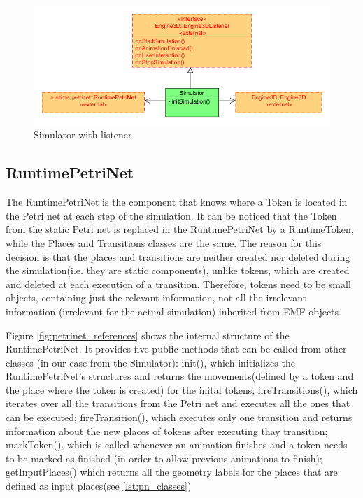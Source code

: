 \begin{figure}[ht]
   \begin{center}
       \includegraphics[scale=0.50]{image/simulator_design.png}
       \caption{Simulator with listener}
       \label{fig:simulator_design}
       \end{center}
   \end{figure}

\subsection{RuntimePetriNet}
The RuntimePetriNet is the component that knows where a Token is located in
the Petri net at each step of the simulation. It can be noticed that the Token
from the static Petri net is replaced in the RuntimePetriNet by a RuntimeToken,
while the Places and Transitions classes are the same. The reason for this decision
is that the places and transitions are neither created nor deleted during the
simulation(i.e. they are static components), unlike tokens, which are created
and deleted at each execution of a transition. Therefore, tokens need to be
small objects, containing just the relevant information, not all the irrelevant
information (irrelevant for the actual simulation) inherited from EMF objects.

Figure \ref{fig:petrinet_references} shows the internal structure of the RuntimePetriNet. It provides
five public methods that can be called from other classes (in our case from the
Simulator): init(), which initializes the RuntimePetriNet's structures and returns the 
movements(defined by a token and the place where the token is created) for the inital tokens; fireTransitions(), 
which iterates over all the transitions from the Petri net and executes all the ones that can be executed; fireTransition(), which
executes only one transition and returns information about the new places of tokens after executing thay transition;
markToken(), which is called whenever an animation finishes and a token needs to
be marked as finished (in order to allow previous animations to finish); getInputPlaces() which returns all
the geometry labels for the places that are defined as input places(see \ref{lst:pn_classes})

